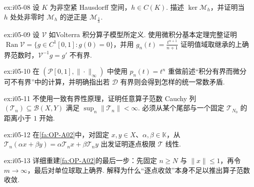 \begin{FAExercise}[乘法算子的核]{ex:i05-08}
设 \(\displaystyle K\) 为非空紧 Hausdorff 空间，\(\displaystyle h\in C(K)\). 描述 \(\displaystyle \ker\mathcal M_h\)，并证明当 \(\displaystyle h\) 处处非零时 \(\displaystyle \mathcal M_h\) 的逆正是 \(\displaystyle \mathcal M_{\frac{1}{h}}\).
\end{FAExercise}

\begin{FAExercise}[Volterra值域与逆映射]{ex:i05-09}
设 \(\displaystyle \mathcal V\) 如Volterra 积分算子模型所定义. 使用微积分基本定理完整证明 \(\displaystyle \operatorname{Ran}\mathcal V=\{g\in C^1[0,1]:g(0)=0\}\)，并用 \(\displaystyle g_n(t)=\frac{t^{n+1}}{n+1}\) 证明值域取继承的上确界范数时，\(\displaystyle \mathcal V^{-1}g=g'\) 不有界.
\end{FAExercise}

\begin{FAExercise}[微分算子不有界]{ex:i05-10}
在 \(\displaystyle (\mathcal P[0,1],\|\cdot\|_\infty)\) 中使用 \(\displaystyle p_n(t)=t^n\) 重做前述“积分有界而微分可不有界”中的计算，并明确指出若 \(\displaystyle \mathcal D\) 有界则会得到怎样的统一常数矛盾.
\end{FAExercise}

\begin{FAExercise}[算子Cauchy列的统一范数上界]{ex:i05-11}
不使用一致有界性原理，证明任意算子范数 Cauchy 列 \(\displaystyle (\mathcal T_n)\subseteq\mathcal B(X,Y)\) 满足 \(\displaystyle \sup_n\|\mathcal T_n\|<\infty\). 必须从某个尾部与一个固定 \(\displaystyle \mathcal T_{N_0}\) 的距离小于 \(\displaystyle1\) 开始.
\end{FAExercise}

\begin{FAExercise}[有界算子空间完备性中的线性极限]{ex:i05-12}
在\autoref{fa:OP-A02}中，对固定 \(\displaystyle x,y\in X\)、\(\displaystyle \alpha,\beta\in\mathbb K\)，从 \(\displaystyle \mathcal T_n(\alpha x+\beta y)=\alpha\mathcal T_nx+\beta\mathcal T_ny\) 出发证明逐点极限 \(\displaystyle \mathcal T\) 线性.
\end{FAExercise}

\begin{FAExercise}[有界算子空间完备性中的算子范数收敛]{ex:i05-13}
详细重建\autoref{fa:OP-A02}的最后一步：先固定 \(\displaystyle n\geqslant N\) 与 \(\displaystyle \|x\|\leqslant1\)，再令 \(\displaystyle m\to\infty\)，最后对单位球取上确界. 解释为什么“逐点收敛”本身不足以推出算子范数收敛.
\end{FAExercise}

